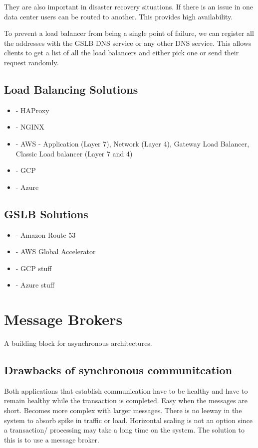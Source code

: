 They are also important in disaster recovery situations.
If there is an issue in one data center users can be routed to another.
This provides high availability.

To prevent a load balancer from being a single point of failure, we can register all the addresses with the GSLB DNS service or any other DNS service.
This allows clients to get a list of all the load balancers and either pick one or send their request randomly.

\subsection{Load Balancing Solutions}
\begin{itemize}
    \item - HAProxy
    \item - NGINX
    \item - AWS - Application (Layer 7), Network (Layer 4), Gateway Load Balancer, Classic Load balancer (Layer 7 and 4)
    \item - GCP %
    \item - Azure %
\end{itemize}

\subsection{GSLB Solutions}
\begin{itemize}
    \item - Amazon Route 53
    \item - AWS Global Accelerator
    \item - GCP stuff
    \item - Azure stuff
\end{itemize}


\section{Message Brokers}
A building block for asynchronous architectures.

\subsection{Drawbacks of synchronous communitcation}
Both applications that establish communication have to be healthy and have to remain healthy while the transaction is completed.
Easy when the messages are short.
Becomes more complex with larger messages.
There is no leeway in the system to absorb spike in traffic or load.
Horizontal scaling is not an option since a transaction/ processing may take a long time on the system.
The solution to this is to use a message broker.

